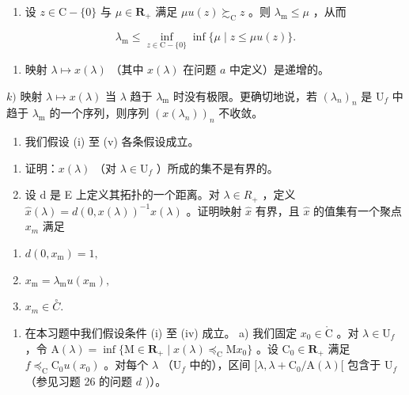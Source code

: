 \begin{enumerate}
\def\labelenumi{\roman{enumi})}
\tightlist
\item
  设 \(z \in \mathrm{C} - \{0\}\) 与 \(\mu \in \mathbf{R}_+\) 满足 \(\mu u(z) \succsim_{\mathrm{C}} z\) 。则 \(\lambda_{\mathrm{m}} \leqslant \mu\) ，从而
\end{enumerate}

\[
\lambda_ {\mathrm{m}} \leqslant \inf _ {z \in \mathrm{C} - \{0 \}} \inf \{\mu \mid z \leqslant \mu u (z) \}.
\]

\begin{enumerate}
\def\labelenumi{\alph{enumi})}
\setcounter{enumi}{9}
\tightlist
\item
  映射 \(\lambda \mapsto x(\lambda)\) （其中 \(x(\lambda)\) 在问题 \(a\) 中定义）是递增的。
\end{enumerate}

\(k)\) 映射 \(\lambda \mapsto x(\lambda)\) 当 \(\lambda\) 趋于 \(\lambda_{\mathrm{m}}\) 时没有极限。更确切地说，若 \((\lambda_n)_n\) 是 \(\mathrm{U}_f\) 中趋于 \(\lambda_{\mathrm{m}}\) 的一个序列，则序列 \((x(\lambda_n))_n\) 不收敛。

\begin{enumerate}
\def\labelenumi{\arabic{enumi})}
\setcounter{enumi}{26}
\tightlist
\item
  我们假设 (i) 至 (v) 各条假设成立。
\end{enumerate}

\begin{enumerate}
\def\labelenumi{\alph{enumi})}
\item
  证明：\(x(\lambda)\) （对 \(\lambda \in \mathrm{U}_f\) ）所成的集不是有界的。
\item
  设 d 是 E 上定义其拓扑的一个距离。对 \(\lambda \in R_{+}\) ，定义 \(\hat{x}(\lambda) = d(0, x(\lambda))^{-1}x(\lambda)\) 。证明映射 \(\hat{x}\) 有界，且 \(\hat{x}\) 的值集有一个聚点 \(x_{m}\) 满足
\end{enumerate}

\begin{enumerate}
\def\labelenumi{(\roman{enumi})}
\item
  \(d(0, x_{\mathrm{m}}) = 1,\)
\item
  \(x_{\mathrm{m}} = \lambda_{\mathrm{m}} u(x_{\mathrm{m}}),\)
\item
  \(x_{m} \in \overset{\circ}{C}.\)
\end{enumerate}

\begin{enumerate}
\def\labelenumi{\arabic{enumi})}
\setcounter{enumi}{27}
\tightlist
\item
  在本习题中我们假设条件 (i) 至 (iv) 成立。 a) 我们固定 \(x_0 \in \mathring{\mathrm{C}}\) 。对 \(\lambda \in \mathrm{U}_f\) ，令 \(\mathrm{A}(\lambda) = \inf \{\mathrm{M} \in \mathbf{R}_+ \mid x(\lambda) \preccurlyeq_{\mathrm{C}} \mathrm{M}x_0\}\) 。设 \(\mathrm{C}_0 \in \mathbf{R}_+\) 满足 \(f \preccurlyeq_{\mathrm{C}} \mathrm{C}_0 u(x_0)\) 。对每个 \(\lambda\) （\(\mathrm{U}_f\) 中的），区间 \([\lambda, \lambda + \mathrm{C}_0 / \mathrm{A}(\lambda)[\) 包含于 \(\mathrm{U}_f\) （参见习题 26 的问题 \(d\) )）。
\end{enumerate}

